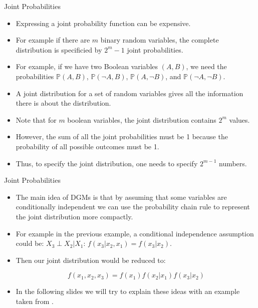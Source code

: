 \documentclass[handout]{beamer}
\begin{document}
\begin{frame}{Joint Probabilities}
\scriptsize{
\begin{itemize}

\item Expressing a joint probability function can be expensive.

\item For example if there are $m$ binary random variables, the complete distribution is specificied by $2^{m}-1$ joint probabilities.

\item For example, if we have two Boolean variables $(A,B)$, we need the probabilities $\mathbb{P}(A,B)$, $\mathbb{P}(\neg A,B)$, $\mathbb{P}(A,\neg B)$, and $\mathbb{P}(\neg A, \neg B)$.

\item A joint distribution for a set of random variables gives all the information there is about the distribution.


\item Note that for $m$ boolean variables, the joint distribution contains $2^m$ values. 

\item However, the sum of all the joint probabilities must be 1 because the probability of all possible outcomes must be 1. 

\item Thus, to specify the joint distribution, one needs to specify $2^{m-1}$ numbers.


\end{itemize}



} 

\end{frame}


\begin{frame}{Joint Probabilities}
\scriptsize{
\begin{itemize}



\item The main idea of DGMs is that by assuming that some variables are conditionally independent we can use the probability chain rule to represent the joint distribution more compactly.

\item For example in the previous example, a conditional independence assumption could be: $X_3 \perp X_2| X_1$: $f(x_3|x_2,x_1)= f(x_3|x_2)$.

\item Then our joint distribution would be reduced to:

\begin{displaymath}
f(x_1,x_2,x_3)=f(x_1)f(x_2|x_1)f(x_3|x_2)
 \end{displaymath}

 
\item In the following slides we will try to explain these ideas with an example taken from \cite{koller2009probabilistic}. 

\end{itemize}



} 

\end{frame}
\end{document}
